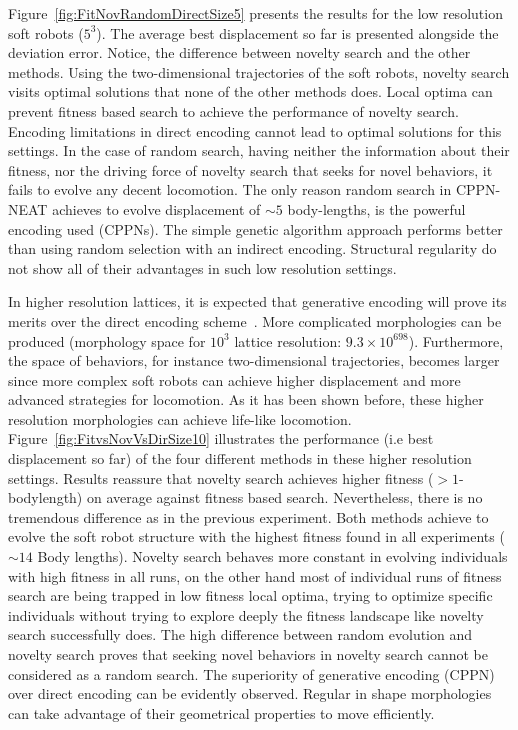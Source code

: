 \documentclass{sig-alternate}
\begin{document}
Figure~\ref{fig:FitNovRandomDirectSize5} presents the results for the low resolution soft robots ($5^3$). The average best displacement so far is presented alongside the deviation error. Notice, the difference between novelty search and the other methods. Using the two-dimensional trajectories of the soft robots, novelty search visits optimal solutions that none of the other methods does. Local optima can prevent fitness based search to achieve the performance of novelty search. Encoding limitations in direct encoding cannot lead to optimal solutions for this settings. In the case of random search, having neither the information about their fitness, nor the driving force of novelty search that seeks for novel behaviors, it fails to evolve any decent locomotion. The only reason random search in CPPN-NEAT achieves to evolve displacement of $\sim 5$ body-lengths, is the powerful encoding used (CPPNs). The simple genetic algorithm approach performs better than using random selection with an indirect encoding. Structural regularity do not show all of their advantages in such low resolution settings.

In higher resolution lattices, it is expected that generative encoding will prove its merits over the direct encoding scheme~\cite{cheney2013unshackling,stanley2007compositional}. More complicated morphologies can be produced (morphology space for $10^3$ lattice resolution: $9.3 \times 10^{698}$). Furthermore, the space of behaviors, for instance two-dimensional trajectories, becomes larger since more complex soft robots can achieve higher displacement and more advanced strategies for locomotion. As it has been shown before, these higher resolution morphologies can achieve life-like locomotion. Figure~\ref{fig:FitvsNovVsDirSize10} illustrates the performance (i.e best displacement so far) of the four different methods in these higher resolution settings. Results reassure that novelty search achieves higher fitness ($> 1$-bodylength) on average against fitness based search. Nevertheless, there is no tremendous difference as in the previous experiment. Both methods achieve to evolve the soft robot structure with the highest fitness found in all experiments ($\sim 14$ Body lengths). Novelty search behaves more constant in evolving individuals with high fitness in all runs, on the other hand most of individual runs of fitness search are being trapped in low fitness local optima, trying to optimize specific individuals without trying to explore deeply the fitness landscape like novelty search successfully does. The high difference between random evolution and novelty search proves that seeking novel behaviors in novelty search cannot be considered as a random search. The superiority of generative encoding (CPPN) over direct encoding can be evidently observed. Regular in shape morphologies can take advantage of their geometrical properties to move efficiently.
\end{document}
